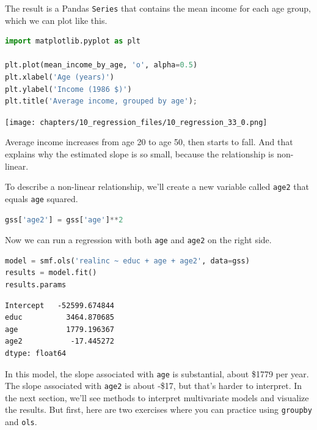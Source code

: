 The result is a Pandas \passthrough{\lstinline!Series!} that contains
the mean income for each age group, which we can plot like this.

\begin{lstlisting}[language=Python,style=source]
import matplotlib.pyplot as plt

plt.plot(mean_income_by_age, 'o', alpha=0.5)
plt.xlabel('Age (years)')
plt.ylabel('Income (1986 $)')
plt.title('Average income, grouped by age');
\end{lstlisting}

\begin{center}
\texttt{[image: chapters/10\_regression\_files/10\_regression\_33\_0.png]}
\end{center}

Average income increases from age 20 to age 50, then starts to fall. And
that explains why the estimated slope is so small, because the
relationship is non-linear.

To describe a non-linear relationship, we'll create a new variable
called \passthrough{\lstinline!age2!} that equals
\passthrough{\lstinline!age!} squared.

\begin{lstlisting}[language=Python,style=source]
gss['age2'] = gss['age']**2
\end{lstlisting}

Now we can run a regression with both \passthrough{\lstinline!age!} and
\passthrough{\lstinline!age2!} on the right side.

\begin{lstlisting}[language=Python,style=source]
model = smf.ols('realinc ~ educ + age + age2', data=gss)
results = model.fit()
results.params
\end{lstlisting}

\begin{lstlisting}[style=output]
Intercept   -52599.674844
educ          3464.870685
age           1779.196367
age2           -17.445272
dtype: float64
\end{lstlisting}

In this model, the slope associated with \passthrough{\lstinline!age!}
is substantial, about \$1779 per year. The slope associated with
\passthrough{\lstinline!age2!} is about -\$17, but that's harder to
interpret. In the next section, we'll see methods to interpret
multivariate models and visualize the results. But first, here are two
exercises where you can practice using \passthrough{\lstinline!groupby!}
and \passthrough{\lstinline!ols!}.

